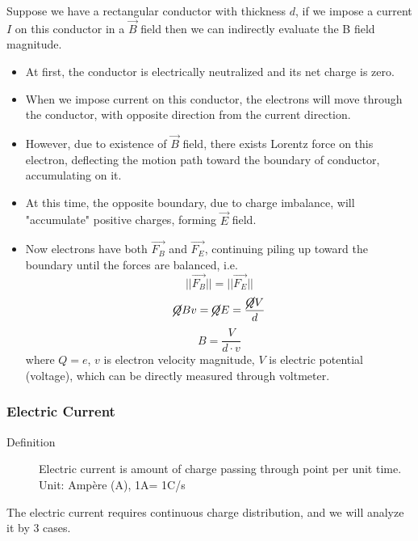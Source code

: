 \documentclass[12pt,a4paper,twoside]{article}
\numberwithin{equation}{section}
\begin{document}
    \noindent Suppose we have a rectangular conductor with thickness $d$, if we impose a current $I$ on this conductor in a $\overrightarrow{B}$ field then we can indirectly evaluate the B field magnitude.
    \begin{itemize}
        \item At first, the conductor is electrically neutralized and its net charge is zero.
        \item When we impose current on this conductor, the electrons will move through the conductor, with opposite direction from the current direction.
        \item However, due to existence of $\overrightarrow{B}$ field, there exists Lorentz force on this electron, deflecting the motion path toward the boundary of conductor, accumulating on it.
        \item At this time, the opposite boundary, due to charge imbalance, will "accumulate" positive charges, forming $\overrightarrow{E}$ field.
        \item Now electrons have both $\overrightarrow{F_B}$ and $\overrightarrow{F_E}$, continuing piling up toward the boundary until the forces are balanced, i.e.
        \[||\overrightarrow{F_B}||=||\overrightarrow{F_E}||\]
        \[\cancel{Q}Bv=\cancel{Q}E=\frac{\cancel{Q}V}{d}\]
        \[B=\frac{V}{d\cdot v}\]
        where $Q=e$, $v$ is electron velocity magnitude, $V$ is electric potential (voltage), which can be directly measured through voltmeter.
    \end{itemize}

\subsubsection{Electric Current}
    \begin{description}
        \item[Definition] Electric current is amount of charge passing through point per unit time. Unit: Amp\`ere (A), 1A= 1C/s
    \end{description}
    The electric current requires continuous charge distribution, and we will analyze it by 3 cases.
    
\end{document}
